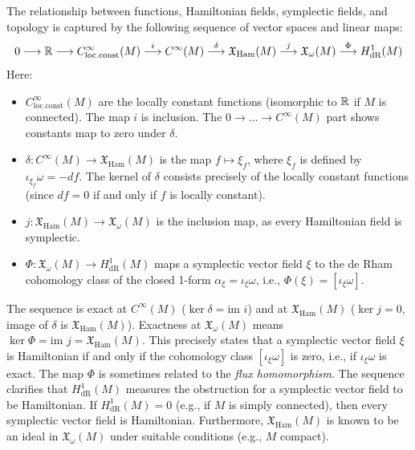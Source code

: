 \begin{remark}
The relationship between functions, Hamiltonian fields, symplectic fields, and topology is captured by the following sequence of vector spaces and linear maps:
\[
0 \longrightarrow \mathbb{R} \longrightarrow C^\infty_{\text{loc.const}}(M) \stackrel{i}{\longrightarrow} C^\infty(M) \stackrel{\delta}{\longrightarrow} \mathfrak{X}_{\mathrm{Ham}}(M) \stackrel{j}{\longrightarrow} \mathfrak{X}_{\omega}(M) \stackrel{\Phi}{\longrightarrow} H^1_{\text{dR}}(M)
\]
Here:
\begin{itemize}
    \item $C^\infty_{\text{loc.const}}(M)$ are the locally constant functions (isomorphic to $\mathbb{R}$ if $M$ is connected). The map $i$ is inclusion. The $0 \to \dots \to C^\infty(M)$ part shows constants map to zero under $\delta$.
    \item $\delta: C^\infty(M) \to \mathfrak{X}_{\mathrm{Ham}}(M)$ is the map $f \mapsto \xi_f$, where $\xi_f$ is defined by $\iota_{\xi_f}\omega = -df$. The kernel of $\delta$ consists precisely of the locally constant functions (since $df=0$ if and only if $f$ is locally constant).
    \item $j: \mathfrak{X}_{\mathrm{Ham}}(M) \to \mathfrak{X}_{\omega}(M)$ is the inclusion map, as every Hamiltonian field is symplectic.
    \item $\Phi: \mathfrak{X}_{\omega}(M) \to H^1_{\text{dR}}(M)$ maps a symplectic vector field $\xi$ to the de Rham cohomology class of the closed 1-form $\alpha_\xi = \iota_\xi \omega$, i.e., $\Phi(\xi) = [\iota_\xi \omega]$.
\end{itemize}
The sequence is exact at $C^\infty(M)$ ($\ker \delta = \text{im } i$) and at $\mathfrak{X}_{\mathrm{Ham}}(M)$ ($\ker j = 0$, image of $\delta$ is $\mathfrak{X}_{\mathrm{Ham}}(M)$). Exactness at $\mathfrak{X}_{\omega}(M)$ means $\ker \Phi = \text{im } j = \mathfrak{X}_{\mathrm{Ham}}(M)$. This precisely states that a symplectic vector field $\xi$ is Hamiltonian if and only if the cohomology class $[\iota_\xi \omega]$ is zero, i.e., if $\iota_\xi \omega$ is exact. The map $\Phi$ is sometimes related to the \textit{flux homomorphism}. The sequence clarifies that $H^1_{\text{dR}}(M)$ measures the obstruction for a symplectic vector field to be Hamiltonian. If $H^1_{\text{dR}}(M) = 0$ (e.g., if $M$ is simply connected), then every symplectic vector field is Hamiltonian. Furthermore, $\mathfrak{X}_{\mathrm{Ham}}(M)$ is known to be an ideal in $\mathfrak{X}_{\omega}(M)$ under suitable conditions (e.g., $M$ compact).
\end{remark}


